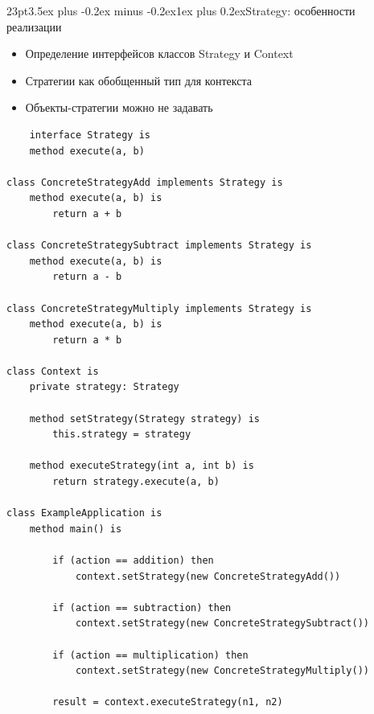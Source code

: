 \documentclass[12pt, a4paper]{book}%
\makeatletter
\renewcommand{\subsection}{\@startsection{subsection}{2}%
{23pt}{3.5ex plus -0.2ex minus -0.2ex}{1ex plus 0.2ex}{\bf}}%
\makeatother
\begin{document}
{\subsection{Strategy: особенности реализации}
\begin{itemize}
    \item Определение интерфейсов классов Strategy и Context
    \item Стратегии как обобщенный тип для контекста
    \item Объекты-стратегии можно не задавать
\end{itemize}
\begin{lstlisting}
    interface Strategy is
    method execute(a, b)

class ConcreteStrategyAdd implements Strategy is
    method execute(a, b) is
        return a + b

class ConcreteStrategySubtract implements Strategy is
    method execute(a, b) is
        return a - b

class ConcreteStrategyMultiply implements Strategy is
    method execute(a, b) is
        return a * b

class Context is
    private strategy: Strategy

    method setStrategy(Strategy strategy) is
        this.strategy = strategy

    method executeStrategy(int a, int b) is
        return strategy.execute(a, b)

class ExampleApplication is
    method main() is

        if (action == addition) then
            context.setStrategy(new ConcreteStrategyAdd())

        if (action == subtraction) then
            context.setStrategy(new ConcreteStrategySubtract())

        if (action == multiplication) then
            context.setStrategy(new ConcreteStrategyMultiply())

        result = context.executeStrategy(n1, n2)
\end{lstlisting}

}
\end{document}
